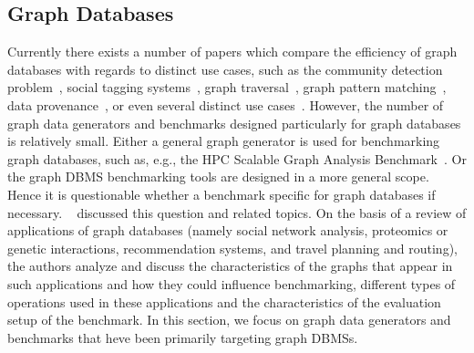 \subsection{Graph Databases}
\label{sec:generators_GraphDatabases}

Currently there exists a number  of papers which compare the efficiency of graph databases with regards to distinct use cases, such as  the community detection problem~\cite{Beis2015}, social tagging systems~\cite{Giatsoglou2011}, graph traversal~\cite{Ciglan:2012:BTO:2374486.2375242}, graph pattern matching~\cite{Pobiedina2014}, data provenance~\cite{Vicknair:2010:CGD:1900008.1900067}, or even several distinct use cases~\cite{Grossniklaus2013Towar-24253}. However, the number of graph data generators and benchmarks designed particularly for graph databases is relatively small. Either a general graph generator is used for benchmarking graph databases, such as, e.g., the HPC Scalable Graph Analysis Benchmark~\cite{Dominguez-Sal:2010:SGD:1927585.1927590}. Or the graph DBMS benchmarking tools are designed in a more general scope. Hence it is questionable whether a benchmark specific for graph databases if necessary. ~\cite{Dominguez-Sal:2010:DDG:1946050.1946053} discussed this question and related topics. On the basis of a review of applications of graph databases (namely social network analysis, proteomics or genetic interactions, recommendation systems, and travel planning and routing), the authors analyze and discuss the characteristics of the graphs that appear in such applications and how they could influence benchmarking, different types of operations used in these applications and the characteristics of the evaluation setup of the benchmark. In this section, we focus on graph data generators and benchmarks that heve been primarily targeting graph DBMSs.


